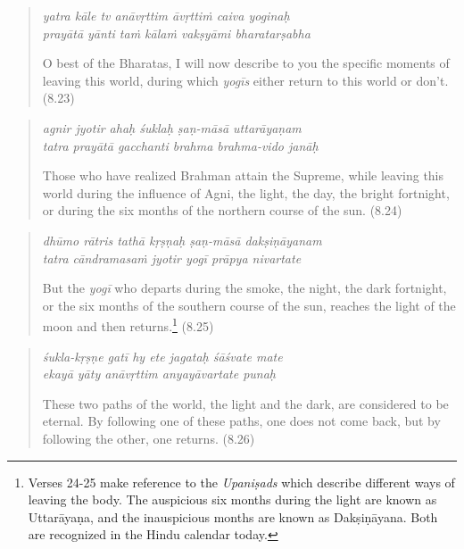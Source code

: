 \documentclass[12pt, twoside, openright]{memoir}
\begin{document}
\par
\begin{verse}
\textit{yatra kāle tv anāvṛttim āvṛttiṁ caiva yoginaḥ} \\
\textit{prayātā yānti taṁ kālaṁ vakṣyāmi bharatarṣabha}

\noindent O best of the Bharatas, I will now describe to you the specific moments of leaving this world, during which \textit{yogīs} either return to this world or don't. (8.23)
\end{verse}
\par



\par
\begin{verse}
\textit{agnir jyotir ahaḥ śuklaḥ ṣaṇ-māsā uttarāyaṇam} \\
\textit{tatra prayātā gacchanti brahma brahma-vido janāḥ}

\noindent Those who have realized Brahman attain the Supreme, while leaving this world during the influence of Agni, the light, the day, the bright fortnight, or during the six months of the northern course of the sun. (8.24)
\end{verse}
\par



\par
\begin{verse}
\textit{dhūmo rātris tathā kṛṣṇaḥ ṣaṇ-māsā dakṣiṇāyanam} \\
\textit{tatra cāndramasaṁ jyotir yogī prāpya nivartate}

\noindent But the \textit{yogī} who departs during the smoke, the night, the dark fortnight, or the six months of the southern course of the sun, reaches the light of the moon and then returns.\footnote{Verses 24-25 make reference to the \textit{Upaniṣads} which describe different ways of leaving the body. The auspicious six months during the light are known as Uttarāyaṇa, and the inauspicious months are known as Dakṣiṇāyana. Both are recognized in the Hindu calendar today.} (8.25)
\end{verse}
\par



\par
\begin{verse}
\textit{śukla-kṛṣṇe gatī hy ete jagataḥ śāśvate mate} \\
\textit{ekayā yāty anāvṛttim anyayāvartate punaḥ}

\noindent These two paths of the world, the light and the dark, are considered to be eternal. By following one of these paths, one does not come back, but by following the other, one returns. (8.26)
\end{verse}
\par
\end{document}
